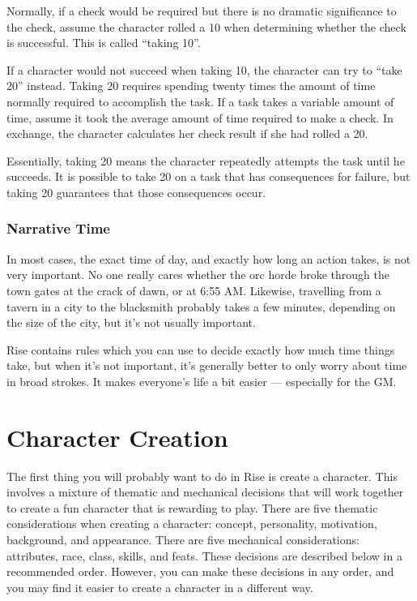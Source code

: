             \label{Taking 10}
            Normally, if a check would be required but there is no dramatic significance to the check, assume the character rolled a 10 when determining whether the check is successful.
            This is called ``taking 10''.

            \label{Taking 20}
            If a character would not succeed when taking 10, the character can try to ``take 20'' instead.
            Taking 20 requires spending twenty times the amount of time normally required to accomplish the task.
            If a task takes a variable amount of time, assume it took the average amount of time required to make a check.
            In exchange, the character calculates her check result if she had rolled a 20.

            Essentially, taking 20 means the character repeatedly attempts the task until he succeeds.
            It is possible to take 20 on a task that has consequences for failure, but taking 20 guarantees that those consequences occur.

        \subsubsection{Narrative Time} In most cases, the exact time of day, and exactly how long an action takes, is not very important.
            No one really cares whether the orc horde broke through the town gates at the crack of dawn, or at 6:55 AM\@.
            Likewise, travelling from a tavern in a city to the blacksmith probably takes a few minutes, depending on the size of the city, but it's not usually important.

            Rise contains rules which you can use to decide exactly how much time things take, but when it's not important, it's generally better to only worry about time in broad strokes.
            It makes everyone's life a bit easier --- especially for the GM\@.

\section{Character Creation}

    The first thing you will probably want to do in Rise is create a character.
    This involves a mixture of thematic and mechanical decisions that will work together to create a fun character that is rewarding to play.
    There are five thematic considerations when creating a character: concept, personality, motivation, background, and appearance.
    There are five mechanical considerations: attributes, race, class, skills, and feats.
    These decisions are described below in a recommended order.
    However, you can make these decisions in any order, and you may find it easier to create a character in a different way.  

